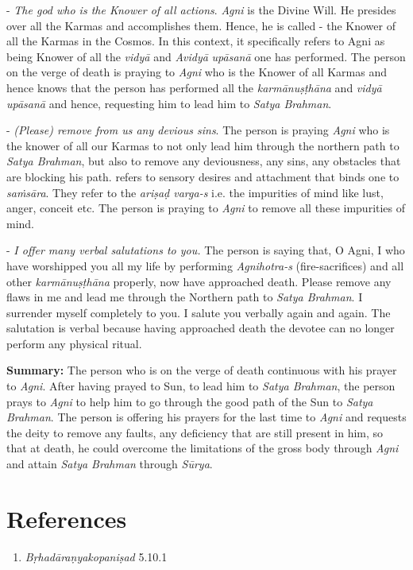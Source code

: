 - \emph{The god who is the Knower of all actions}. \emph{Agni} is the Divine Will. He presides over all the Karmas and accomplishes them. Hence, he is called - the Knower of all the Karmas in the Cosmos. In this context, it specifically refers to Agni as being Knower of all the \emph{vidyā} and \emph{Avidyā} \emph{upāsanā} one has performed. The person on the verge of death is praying to \emph{Agni} who is the Knower of all Karmas and hence knows that the person has performed all the \emph{karmānuṣṭhāna} and \emph{vidyā} \emph{upāsanā} and hence, requesting him to lead him to \emph{Satya Brahman}.

- \emph{(Please) remove from us any devious sins}. The person is praying \emph{Agni} who is the knower of all our Karmas to not only lead him through the northern path to \emph{Satya Brahman}, but also to remove any deviousness, any sins, any obstacles that are blocking his path.  refers to sensory desires and attachment that binds one to \emph{saṁsāra}. They refer to the \emph{ariṣaḍ varga-s} i.e. the impurities of mind like lust, anger, conceit etc. The person is praying to \emph{Agni} to remove all these impurities of mind.

- \emph{I offer many verbal salutations to you.} The person is saying that, O Agni, I who have worshipped you all my life by performing \emph{Agnihotra-s} (fire-sacrifices) and all other \emph{karmānuṣṭhāna} properly, now have approached death. Please remove any flaws in me and lead me through the Northern path to \emph{Satya Brahman}. I surrender myself completely to you. I salute you verbally again and again. The salutation is verbal because having approached death the devotee can no longer perform any physical ritual.

\textbf{Summary:} The person who is on the verge of death continuous with his prayer to \emph{Agni}. After having prayed to Sun, to lead him to \emph{Satya Brahman}, the person prays to \emph{Agni} to help him to go through the good path of the Sun to \emph{Satya Brahman}. The person is offering his prayers for the last time to \emph{Agni} and requests the deity to remove any faults, any deficiency that are still present in him, so that at death, he could overcome the limitations of the gross body through \emph{Agni} and attain \emph{Satya Brahman} through \emph{Sūrya}.

\section*{References}

\begin{enumerate}
\item
  \emph{Bṛhadāraṇyakopaniṣad} 5.10.1
\end{enumerate}


